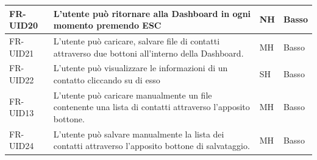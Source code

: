 \documentclass[a4paper,12pt]{article}
\begin{document}
\begin{longtable}{|l|p{8cm}|l|l|}
        FR-UID20 & L'utente può ritornare alla Dashboard in ogni momento premendo ESC & NH & Basso \\ \hline
        FR-UID21 & L'utente può caricare, salvare file di contatti attraverso due bottoni all'interno della Dashboard. & MH & Basso \\ \hline
        FR-UID22 & L'utente può visualizzare le informazioni di un contatto cliccando su di esso & SH & Basso \\ \hline
        FR-UID13 & L'utente può caricare manualmente un file contenente una lista di contatti attraverso l'apposito bottone. & MH & Basso \\ \hline
        FR-UID24 & L'utente può salvare manualmente la lista dei contatti attraverso l'apposito bottone di salvataggio. & MH & Basso \\ \hline
    \end{longtable}
\end{document}
